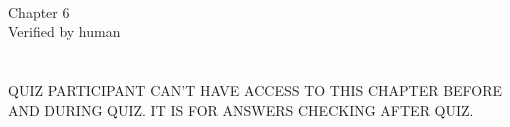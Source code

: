 \documentclass{report}
\begin{document}
\begin{flushleft}
\begin{minipage}{\linewidth}
\setcounter{enumi}{4}


\blank[width=\linewidth]{}~\\
\end{minipage}

\begin{minipage}{\linewidth}
\begin{center}
Chapter 6\\
Verified by human\\
\end{center}
\hspace{22pt}
\end{minipage}
\end{flushleft}

\chapter{}
QUIZ PARTICIPANT CAN'T HAVE ACCESS TO THIS CHAPTER BEFORE AND DURING QUIZ. IT IS FOR ANSWERS CHECKING AFTER QUIZ.\\\\
\printsolutions
\end{document}
